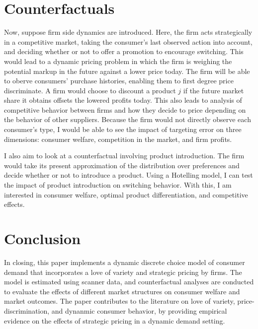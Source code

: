 \documentclass[11pt]{article}
\theoremstyle{definition}
\theoremstyle{remark}
\begin{document}
\section{Counterfactuals}

Now, suppose firm side dynamics are introduced. Here, the firm acts strategically in a competitive market, taking the consumer's last observed action into account, and deciding whether or not to offer a promotion to encourage switching. This would lead to a dynamic pricing problem in which the firm is weighing the potential markup in the future against a lower price today. The firm will be able to oberve consumers' purchase histories, enabling them to first degree price discriminate. A firm would choose to discount a product $j$ if the future market share it obtains offsets the lowered profits today. This also leads to analysis of competitive behavior between firms and how they decide to price depending on the behavior of other suppliers. Because the firm would not directly observe each consumer's type, I would be able to see the impact of targeting error on three dimensions: consumer welfare, competition in the market, and firm profits.

I also aim to look at a counterfactual involving product introduction. The firm would take its present approximation of the distribution over preferences and decide whether or not to introduce a product. Using a Hotelling model, I can test the impact of product introduction on switching behavior. With this, I am interested in consumer welfare, optimal product differentiation, and competitive effects.

\section{Conclusion}

In closing, this paper implements a dynamic discrete choice model of consumer demand that incorporates a love of variety and strategic pricing by firms. The model is estimated using scanner data, and counterfactual analyses are conducted to evaluate the effects of different market structures on consumer welfare and market outcomes. The paper contributes to the literature on love of variety, price-discrimination, and dynanmic consumer behavior, by providing empirical evidence on the effects of strategic pricing in a dynamic demand setting. 
\end{document}

